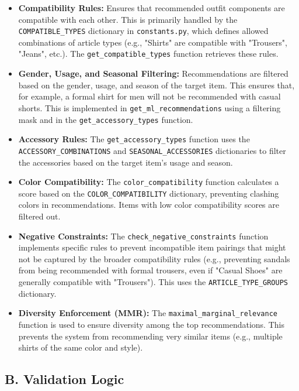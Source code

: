 \documentclass[12pt,a4paper]{article}
\begin{document}
\begin{itemize}[leftmargin=*, itemsep=0.3em]
    \item \textbf{Compatibility Rules:}  Ensures that recommended outfit components are compatible with each other.  This is primarily handled by the \texttt{COMPATIBLE\_TYPES} dictionary in \texttt{constants.py}, which defines allowed combinations of article types (e.g., "Shirts" are compatible with "Trousers", "Jeans", etc.).  The \texttt{get\_compatible\_types} function retrieves these rules.

    \item \textbf{Gender, Usage, and Seasonal Filtering:}  Recommendations are filtered based on the gender, usage, and season of the target item.  This ensures that, for example, a formal shirt for men will not be recommended with casual shorts. This is implemented in \texttt{get\_ml\_recommendations} using a filtering mask and in the \texttt{get\_accessory\_types} function.
    \item \textbf{Accessory Rules:} The \texttt{get\_accessory\_types} function uses the  \texttt{ACCESSORY\_COMBINATIONS} and \texttt{SEASONAL\_ACCESSORIES} dictionaries to filter the accessories based on the target item's usage and season.

    \item \textbf{Color Compatibility:}  The \texttt{color\_compatibility} function calculates a score based on the \texttt{COLOR\_COMPATIBILITY} dictionary, preventing clashing colors in recommendations.  Items with low color compatibility scores are filtered out.

    \item \textbf{Negative Constraints:}  The \texttt{check\_negative\_constraints} function implements specific rules to prevent incompatible item pairings that might not be captured by the broader compatibility rules (e.g., preventing sandals from being recommended with formal trousers, even if "Casual Shoes" are generally compatible with "Trousers"). This uses the \texttt{ARTICLE\_TYPE\_GROUPS} dictionary.

    \item \textbf{Diversity Enforcement (MMR):}  The \texttt{maximal\_marginal\_relevance} function is used to ensure diversity among the top recommendations.  This prevents the system from recommending very similar items (e.g., multiple shirts of the same color and style).
\end{itemize}

\subsection*{B. Validation Logic}
\end{document}
